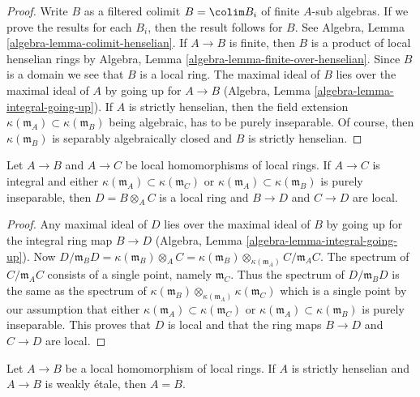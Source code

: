 \begin{proof}
Write $B$ as a filtered colimit $B = \colim B_i$ of finite $A$-sub algebras.
If we prove the results for each $B_i$, then the result follows for $B$.
See Algebra, Lemma \ref{algebra-lemma-colimit-henselian}.
If $A \to B$ is finite, then $B$ is a product of local henselian rings by
Algebra, Lemma \ref{algebra-lemma-finite-over-henselian}.
Since $B$ is a domain we see that $B$ is a local ring.
The maximal ideal of $B$ lies over the maximal ideal of $A$ by
going up for $A \to B$ (Algebra, Lemma \ref{algebra-lemma-integral-going-up}).
If $A$ is strictly henselian, then the field extension
$\kappa(\mathfrak m_A) \subset \kappa(\mathfrak m_B)$
being algebraic, has to be purely inseparable.
Of course, then $\kappa(\mathfrak m_B)$ is separably algebraically
closed and $B$ is strictly henselian.
\end{proof}

\begin{lemma}
\label{lemma-local-tensor-with-integral}
Let $A \to B$ and $A \to C$ be local homomorphisms of local rings.
If $A \to C$ is integral and either
$\kappa(\mathfrak m_A) \subset \kappa(\mathfrak m_C)$ or
$\kappa(\mathfrak m_A) \subset \kappa(\mathfrak m_B)$ is purely
inseparable, then $D = B \otimes_A C$ is a local ring and
$B \to D$ and $C \to D$ are local.
\end{lemma}

\begin{proof}
Any maximal ideal of $D$ lies over the maximal ideal of $B$ by
going up for the integral ring map
$B \to D$ (Algebra, Lemma \ref{algebra-lemma-integral-going-up}).
Now $D/\mathfrak m_B D = \kappa(\mathfrak m_B) \otimes_A C =
\kappa(\mathfrak m_B) \otimes_{\kappa(\mathfrak m_A)} C/\mathfrak m_A C$.
The spectrum of $C/\mathfrak m_A C$ consists of a
single point, namely $\mathfrak m_C$. Thus the spectrum of
$D/\mathfrak m_B D$ is the same as the spectrum of
$\kappa(\mathfrak m_B) \otimes_{\kappa(\mathfrak m_A)} \kappa(\mathfrak m_C)$
which is a single point by our assumption that either
$\kappa(\mathfrak m_A) \subset \kappa(\mathfrak m_C)$ or
$\kappa(\mathfrak m_A) \subset \kappa(\mathfrak m_B)$ is purely
inseparable. This proves that $D$ is local and that the ring maps
$B \to D$ and $C \to D$ are local.
\end{proof}

\begin{theorem}[Olivier]
\label{theorem-olivier}
Let $A \to B$ be a local homomorphism of local rings.
If $A$ is strictly henselian and $A \to B$ is weakly \'etale, then
$A = B$.
\end{theorem}

